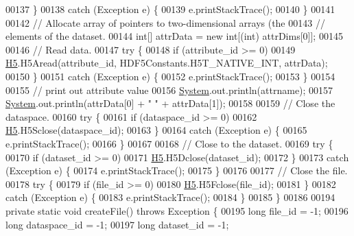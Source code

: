 \begin{DoxyCode}
00137         \}
00138         \textcolor{keywordflow}{catch} (Exception e) \{
00139             e.printStackTrace();
00140         \}
00141 
00142         \textcolor{comment}{// Allocate array of pointers to two-dimensional arrays (the}
00143         \textcolor{comment}{// elements of the dataset.}
00144         \textcolor{keywordtype}{int}[] attrData = \textcolor{keyword}{new} \textcolor{keywordtype}{int}[(int) attrDims[0]];
00145 
00146         \textcolor{comment}{// Read data.}
00147         \textcolor{keywordflow}{try} \{
00148             \textcolor{keywordflow}{if} (attribute\_id >= 0)
00149                 \hyperlink{namespace_h5}{H5}.H5Aread(attribute\_id, HDF5Constants.H5T\_NATIVE\_INT, attrData);
00150         \}
00151         \textcolor{keywordflow}{catch} (Exception e) \{
00152             e.printStackTrace();
00153         \}
00154 
00155         \textcolor{comment}{// print out attribute value}
00156         \hyperlink{namespace_system}{System}.out.println(attrname);
00157         \hyperlink{namespace_system}{System}.out.println(attrData[0] + \textcolor{stringliteral}{"  "} + attrData[1]);
00158 
00159         \textcolor{comment}{// Close the dataspace.}
00160         \textcolor{keywordflow}{try} \{
00161             \textcolor{keywordflow}{if} (dataspace\_id >= 0)
00162                 \hyperlink{namespace_h5}{H5}.H5Sclose(dataspace\_id);
00163         \}
00164         \textcolor{keywordflow}{catch} (Exception e) \{
00165             e.printStackTrace();
00166         \}
00167 
00168         \textcolor{comment}{// Close to the dataset.}
00169         \textcolor{keywordflow}{try} \{
00170             \textcolor{keywordflow}{if} (dataset\_id >= 0)
00171                 \hyperlink{namespace_h5}{H5}.H5Dclose(dataset\_id);
00172         \}
00173         \textcolor{keywordflow}{catch} (Exception e) \{
00174             e.printStackTrace();
00175         \}
00176 
00177         \textcolor{comment}{// Close the file.}
00178         \textcolor{keywordflow}{try} \{
00179             \textcolor{keywordflow}{if} (file\_id >= 0)
00180                 \hyperlink{namespace_h5}{H5}.H5Fclose(file\_id);
00181         \}
00182         \textcolor{keywordflow}{catch} (Exception e) \{
00183             e.printStackTrace();
00184         \}
00185     \}
00186 
00194     \textcolor{keyword}{private} \textcolor{keyword}{static} \textcolor{keywordtype}{void} createFile() \textcolor{keywordflow}{throws} Exception \{
00195         \textcolor{keywordtype}{long} file\_id = -1;
00196         \textcolor{keywordtype}{long} dataspace\_id = -1;
00197         \textcolor{keywordtype}{long} dataset\_id = -1;

\end{DoxyCode}
